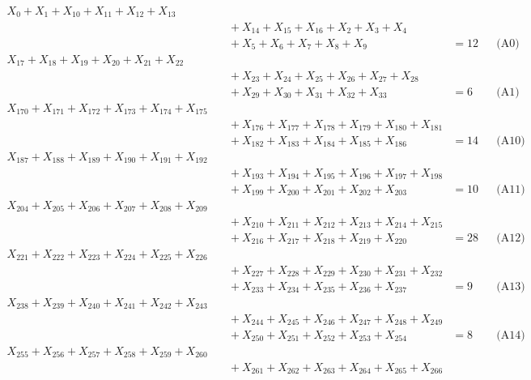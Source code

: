 \documentclass[a4paper,10pt]{article}
\begin{document}
\allowdisplaybreaks
{\small\begin{align}
X_{0} + X_{1} + X_{10} + X_{11} + X_{12} + X_{13} \\[0.5ex]
&\quad  + X_{14} + X_{15} + X_{16} + X_{2} + X_{3} + X_{4} \\[0.5ex]
&\quad  + X_{5} + X_{6} + X_{7} + X_{8} + X_{9} &= 12 && \text{(A0)} \\
X_{17} + X_{18} + X_{19} + X_{20} + X_{21} + X_{22} \\[0.5ex]
&\quad  + X_{23} + X_{24} + X_{25} + X_{26} + X_{27} + X_{28} \\[0.5ex]
&\quad  + X_{29} + X_{30} + X_{31} + X_{32} + X_{33} &= 6 && \text{(A1)} \\
X_{170} + X_{171} + X_{172} + X_{173} + X_{174} + X_{175} \\[0.5ex]
&\quad  + X_{176} + X_{177} + X_{178} + X_{179} + X_{180} + X_{181} \\[0.5ex]
&\quad  + X_{182} + X_{183} + X_{184} + X_{185} + X_{186} &= 14 && \text{(A10)} \\
X_{187} + X_{188} + X_{189} + X_{190} + X_{191} + X_{192} \\[0.5ex]
&\quad  + X_{193} + X_{194} + X_{195} + X_{196} + X_{197} + X_{198} \\[0.5ex]
&\quad  + X_{199} + X_{200} + X_{201} + X_{202} + X_{203} &= 10 && \text{(A11)} \\
X_{204} + X_{205} + X_{206} + X_{207} + X_{208} + X_{209} \\[0.5ex]
&\quad  + X_{210} + X_{211} + X_{212} + X_{213} + X_{214} + X_{215} \\[0.5ex]
&\quad  + X_{216} + X_{217} + X_{218} + X_{219} + X_{220} &= 28 && \text{(A12)} \\
X_{221} + X_{222} + X_{223} + X_{224} + X_{225} + X_{226} \\[0.5ex]
&\quad  + X_{227} + X_{228} + X_{229} + X_{230} + X_{231} + X_{232} \\[0.5ex]
&\quad  + X_{233} + X_{234} + X_{235} + X_{236} + X_{237} &= 9 && \text{(A13)} \\
X_{238} + X_{239} + X_{240} + X_{241} + X_{242} + X_{243} \\[0.5ex]
&\quad  + X_{244} + X_{245} + X_{246} + X_{247} + X_{248} + X_{249} \\[0.5ex]
&\quad  + X_{250} + X_{251} + X_{252} + X_{253} + X_{254} &= 8 && \text{(A14)} \\
X_{255} + X_{256} + X_{257} + X_{258} + X_{259} + X_{260} \\[0.5ex]
&\quad  + X_{261} + X_{262} + X_{263} + X_{264} + X_{265} + X_{266} \\[0.5ex]

\end{align}}
\end{document}
